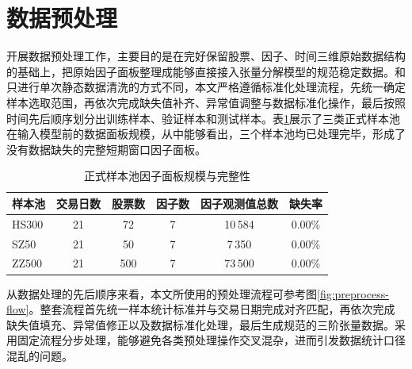 \section{数据预处理}

开展数据预处理工作，主要目的是在完好保留股票、因子、时间三维原始数据结构的基础上，把原始因子面板整理成能够直接接入张量分解模型的规范稳定数据。和只进行单次静态数据清洗的方式不同，本文严格遵循标准化处理流程，先统一确定样本选取范围，再依次完成缺失值补齐、异常值调整与数据标准化操作，最后按照时间先后顺序划分出训练样本、验证样本和测试样本。表\ref{tab:preprocess-panel-summary}展示了三类正式样本池在输入模型前的数据面板规模，从中能够看出，三个样本池均已处理完毕，形成了没有数据缺失的完整短期窗口因子面板。

\begin{table}[htbp]
\centering
\caption{正式样本池因子面板规模与完整性}
\label{tab:preprocess-panel-summary}
\small
\begin{tabular}{lccccc}
\toprule
样本池 & 交易日数 & 股票数 & 因子数 & 因子观测值总数 & 缺失率 \\
\midrule
HS300 & 21 & 72 & 7 & 10\,584 & 0.00\% \\
SZ50  & 21 & 50 & 7 & 7\,350  & 0.00\% \\
ZZ500 & 21 & 500 & 7 & 73\,500 & 0.00\% \\
\bottomrule
\end{tabular}
\end{table}

从数据处理的先后顺序来看，本文所使用的预处理流程可参考图\ref{fig:preprocess-flow}。整套流程首先统一样本统计标准并与交易日期完成对齐匹配，再依次完成缺失值填充、异常值修正以及数据标准化处理，最后生成规范的三阶张量数据。采用固定流程分步处理，能够避免各类预处理操作交叉混杂，进而引发数据统计口径混乱的问题。

